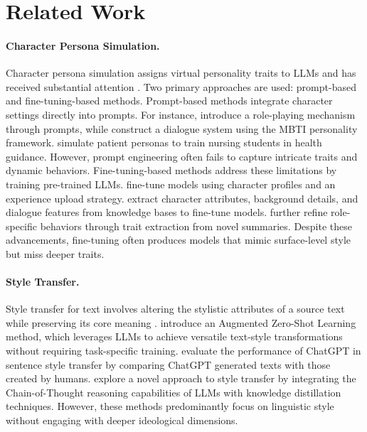 \section{Related Work}
\paragraph{Character Persona Simulation.}
Character persona simulation assigns virtual personality traits to LLMs and has received substantial attention \cite{cheng2023towards, tseng2024two, samuel2024personagym}. Two primary approaches are used: prompt-based and fine-tuning-based methods.
Prompt-based methods integrate character settings directly into prompts. For instance, \citet{shanahan2023role} introduce a role-playing mechanism through prompts, while \citet{tu2023characterchat} construct a dialogue system using the MBTI personality framework. \citet{agatsuma2024building} simulate patient personas to train nursing students in health guidance. However, prompt engineering often fails to capture intricate traits and dynamic behaviors.
Fine-tuning-based methods address these limitations by training pre-trained LLMs. \citet{shao2023character} fine-tune models using character profiles and an experience upload strategy. \citet{lu2024large} extract character attributes, background details, and dialogue features from knowledge bases to fine-tune models. 
\citet{park2024enhancing} further refine role-specific behaviors through trait extraction from novel summaries. Despite these advancements, fine-tuning often produces models that mimic surface-level style but miss deeper traits.

\paragraph{Style Transfer.}  
Style transfer for text involves altering the stylistic attributes of a source text while preserving its core meaning \cite{li2023stylized}.
\citet{reif2022recipe} introduce an Augmented Zero-Shot Learning method, which leverages LLMs to achieve versatile text-style transformations without requiring task-specific training.
\citet{pu2023chatgpt} evaluate the performance of ChatGPT in sentence style transfer by comparing ChatGPT generated texts with those created by humans.
\citet{zhang2024distilling} explore a novel approach to style transfer by integrating the Chain-of-Thought reasoning capabilities of LLMs with knowledge distillation techniques.
However, these methods predominantly focus on linguistic style without engaging with deeper ideological dimensions.

